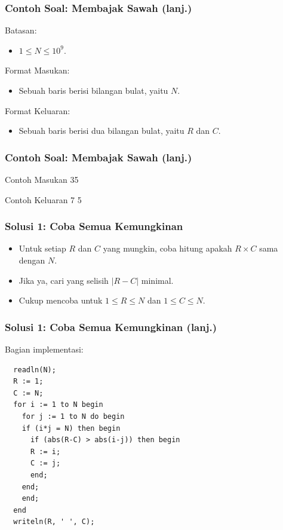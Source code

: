 \begin{frame}
\frametitle{Contoh Soal: Membajak Sawah (lanj.)}
Batasan:
\begin{itemize}
  \item $1 \le N \le 10^9$.
\end{itemize}

\hfill

Format Masukan:
\begin{itemize}
  \item Sebuah baris berisi bilangan bulat, yaitu $N$.
\end{itemize}

\hfill

Format Keluaran:
\begin{itemize}
  \item Sebuah baris berisi dua bilangan bulat, yaitu $R$ dan $C$.
\end{itemize}

\end{frame}

\begin{frame}
\frametitle{Contoh Soal: Membajak Sawah (lanj.)}

\begin{block}{Contoh Masukan}
35
\end{block}

\hfill

\begin{block}{Contoh Keluaran}
7 5
\end{block}

\end{frame}

\begin{frame}
\frametitle{Solusi 1: Coba Semua Kemungkinan}
\begin{itemize}
  \item Untuk setiap $R$ dan $C$ yang mungkin, coba hitung apakah $R \times C$ sama dengan $N$.
  \item Jika ya, cari yang selisih $|R-C|$ minimal.
  \item Cukup mencoba untuk $1 \le R \le N$ dan $1 \le C \le N$.
\end{itemize}
\end{frame}

\begin{frame}[fragile]
\frametitle{Solusi 1: Coba Semua Kemungkinan (lanj.)}
Bagian implementasi:
\begin{lstlisting}
  readln(N);
  R := 1;
  C := N;
  for i := 1 to N begin
    for j := 1 to N do begin
    if (i*j = N) then begin
      if (abs(R-C) > abs(i-j)) then begin
      R := i;
      C := j;
      end;
    end;
    end;
  end
  writeln(R, ' ', C);
\end{lstlisting}
\end{frame}


